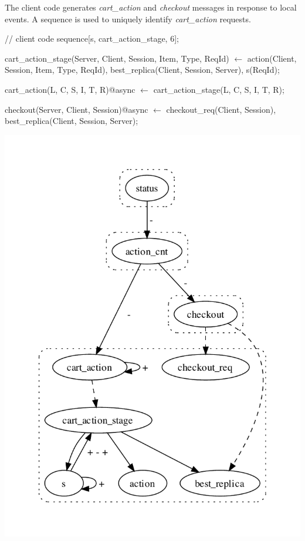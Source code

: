 The client code generates {\em cart\_action} and {\em checkout} messages in response
to local events.  A sequence is used to uniquely identify {\em cart\_action} requests.

\begin{Dedalus}
// client code
sequence[s, cart_action_stage, 6];

cart_action_stage(Server, Client, Session,
                  Item, Type, ReqId) \(\leftarrow\)
  action(Client, Session, Item, Type, ReqId),
  best_replica(Client, Session, Server),
  s(ReqId);

cart_action(L, C, S, I, T, R)@async \(\leftarrow\)
  cart_action_stage(L, C, S, I, T, R);

checkout(Server, Client, Session)@async \(\leftarrow\)
  checkout_req(Client, Session),
  best_replica(Client, Session, Server);
\end{Dedalus}



\includegraphics[width=0.9\linewidth]{vizza_brick.pdf}


